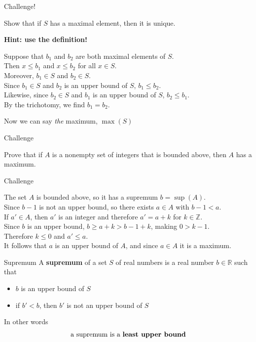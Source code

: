 \documentclass{beamer}
\begin{document}
\begin{frame}{Challenge!}
\begin{prob}
Show that if $S$ has a maximal element, then it is unique.
\end{prob}
\pause
\textbf{Hint: use the definition!}
\pause
\begin{soln}
Suppose that $b_1$ and $b_2$ are both maximal elements of $S$.\\
\pause
Then $x\leq b_1$ and $x\leq b_2$ for all $x\in S$.\\
\pause
Moreover, $b_1\in S$ and $b_2\in S$.\\
\pause
Since $b_1\in S$ and $b_2$ is an upper bound of $S$, $b_1\leq b_2$.\\
\pause
Likewise, since $b_2\in S$ and $b_1$ is an upper bound of $S$, $b_2\leq b_1$.\\
\pause
By the trichotomy, we find $b_1=b_2$.
\end{soln}
\pause
Now we can say \emph{the} maximum, $\max(S)$
\end{frame}

\begin{frame}{Challenge}
\begin{prob}
Prove that if $A$ is a nonempty set of integers that is bounded above, then $A$ has a maximum.
\end{prob}
\end{frame}

\begin{frame}{Challenge}
\begin{soln}
The set $A$ is bounded above, so it has a supremum $b=\sup(A)$. \\
\pause
Since $b-1$ is not an upper bound, so there exists $a\in A$ with $b-1 < a$. \\
\pause
If $a'\in A$, then $a'$ is an integer and therefore $a' = a+k$ for $k\in \mathbb{Z}$. \\
\pause
Since $b$ is an upper bound, $b\geq a+k>b-1+k$, making $0 > k-1$. \\
\pause
Therefore $k\leq 0$ and $a'\leq a$. \\
\pause
It follows that $a$ is an upper bound of $A$, and since $a\in A$ it is a maximum.
\end{soln}
\end{frame}


\begin{frame}{Supremum}
A \textbf{supremum} of a set $S$ of real numbers is a real number $b\in\mathbb{R}$ such that
\begin{itemize}
\item $b$ is an upper bound of $S$
\item if $b'<b$, then $b'$ is not an upper bound of $S$
\end{itemize}
\pause
In other words
$$\text{a supremum is a \bf{least upper bound}}$$
\end{frame}
\end{document}
